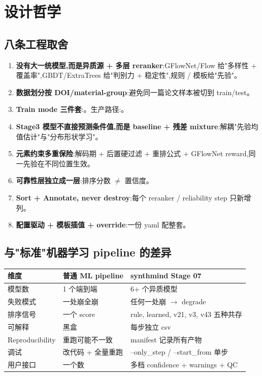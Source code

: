 \section{设计哲学}

\subsection{八条工程取舍}

\begin{enumerate}
    \item \textbf{没有大一统模型,而是异质源 + 多层 reranker}:GFlowNet/Flow 给"多样性 + 覆盖率",GBDT/ExtraTrees 给"判别力 + 稳定性",规则 / 模板给"先验"。
    \item \textbf{数据划分按 DOI/material-group}:避免同一篇论文样本被切到 train/test。
    \item \textbf{Train mode 三件套}:。生产路径:。
    \item \textbf{Stage3 模型不直接预测条件值,而是 baseline + 残差 mixture}:解耦"先验均值估计"与"分布形状学习"。
    \item \textbf{元素约束多重保险}:解码期 + 后置硬过滤 + 重排公式 + GFlowNet reward,同一先验在不同位置生效。
    \item \textbf{可靠性层独立成一层}:排序分数 $\neq$ 置信度。
    \item \textbf{Sort + Annotate, never destroy}:每个 reranker / reliability step 只新增列。
    \item \textbf{配置驱动 + 模板插值 + override}:一份 yaml 配整套。
\end{enumerate}

\subsection{与"标准"机器学习 pipeline 的差异}

\begin{center}
\small
\begin{tabular}{lll}
\toprule
维度 & 普通 ML pipeline & synthmind Stage 07 \\
\midrule
模型数 & 1 个端到端 & 6+ 个异质模型 \\
失败模式 & 一处崩全崩 & 任何一处崩 $\to$ degrade \\
排序信号 & 一个 score & rule, learned, v21, v3, v43 五种共存 \\
可解释 & 黑盒 & 每步独立 csv \\
Reproducibility & 重跑可能不一致 & manifest 记录所有产物 \\
调试 & 改代码 + 全量重跑 & --only\_step / --start\_from 单步 \\
用户接口 & 一个数 & 多档 confidence + warnings + QC \\
\bottomrule
\end{tabular}
\end{center}

